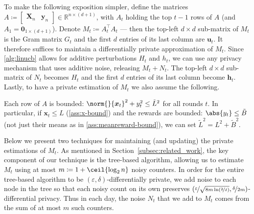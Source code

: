 \documentclass{article}
\renewcommand{\vec}[1]{\bm{#1}}
\newcommand{\defeq}{\coloneq}
\newcommand{\Real}{\mathds{R}}
\DeclarePairedDelimiter{\abs}||
\DeclarePairedDelimiter{\ceil}\lceil\rceil
\providecommand\transp{\top}
\let\transpsymbol\transp
\renewcommand{\transp}[1]{#1^\transpsymbol}
\newcommand{\XtX}[1]{\transp{#1}{#1}}
\begin{document}
To make the following exposition simpler, define the matrices
$A \defeq \begin{bmatrix} \vec X_n & \vec y_n \end{bmatrix} \in
\Real^{n\times(d+1)}$, with $A_t$ holding the top $t-1$ rows of $A$
(and $A_1 = \vec 0_{1\times(d+1)}$).  Denote $M_t \defeq \XtX{A_t}$
--- then the top-left $d\times d$ sub-matrix of $M_t$ is the Gram
matrix $G_t$ and the first $d$ entries of its last column are
$\vec u_t$.  It therefore suffices to maintain a differentially
private approximation of $M_t$. Since \cref{alg:linucb} allows for
additive perturbations $H_t$ and $h_t$, we can use any privacy
mechanism that uses additive noise, releasing $M_t + N_t$.  The
top-left $d\times d$ sub-matrix of $N_t$ becomes $H_t$ and the first
$d$ entries of its last column become $\vec h_t$. Lastly, to have a private estimation of $M_t$ we also assume the following.
\begin{assumption}\label{ass:bounded-data}
  Each row of $A$ is bounded:
  $\norm{}{\vec x_t}^2 + y_t^2 \le \tilde L^2$ for all rounds $t$.  In
  particular, if $\vec x_t \le L$ (\cref{ass:x-bound}) and
  the rewards are bounded: $\abs{y_t} \le \tilde B$ (not just their
  means as in \cref{ass:meanreward-bound}), we can set $\tilde L^2 = L^2 + \tilde B^2$.
\end{assumption}
Below we present two techniques for maintaining (and updating) the
private estimations of $M_t$. As mentioned in
Section~\ref{subsec:related_work}, the key component of our technique is
the tree-based algorithm, allowing us to estimate $M_t$ using at most
$m \defeq 1 + \ceil{\log_2n}$ noisy counters. In order for the entire
tree-based algorithm to be $(\varepsilon,\delta)$-differentially
private, we add noise to each node in the tree so that each noisy
count on its own preserves
$(\nicefrac{\varepsilon}{\sqrt{8m\ln(\nicefrac{2}{\delta})}},
\nicefrac{\delta}{2m})$-differential privacy. Thus in each day, the
noise $N_t$ that we add to $M_t$ comes from the sum of at most $m$
such counters.


\end{document}
